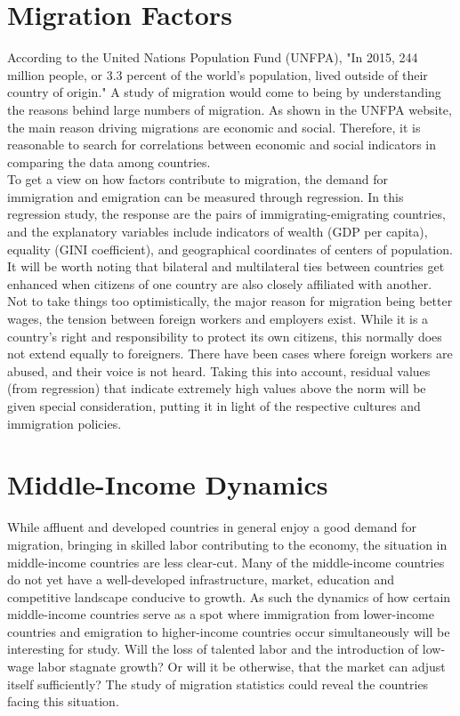 \documentclass{acm_proc_article-sp}
\begin{document}
\section{Migration Factors}
According to the United Nations Population Fund (UNFPA), "In 2015, 244 million people, or 3.3 percent of the world's population, lived outside of their country of origin." \cite{UNPopFund} A study of migration would come to being by understanding the reasons behind large numbers of migration. As shown in the UNFPA website, the main reason driving migrations are economic and social. Therefore, it is reasonable to search for correlations between economic and social indicators in comparing the data among countries.\\
To get a view on how factors contribute to migration, the demand for immigration and emigration can be measured through regression. In this regression study, the response are the pairs of immigrating-emigrating countries, and the explanatory variables include indicators of wealth (GDP per capita), equality (GINI coefficient), and geographical coordinates of centers of population. It will be worth noting that bilateral and multilateral ties between countries get enhanced when citizens of one country are also closely affiliated with another. Not to take things too optimistically, the major reason for migration being better wages, the tension between foreign workers and employers exist. While it is a country's right and responsibility to protect its own citizens, this normally does not extend equally to foreigners. There have been cases where foreign workers are abused, and their voice is not heard. Taking this into account, residual values (from regression) that indicate extremely high values above the norm will be given special consideration, putting it in light of the respective cultures and immigration policies. 

\section{Middle-Income Dynamics}
While affluent and developed countries in general enjoy a good demand for migration, bringing in skilled labor contributing to the economy, the situation in middle-income countries are less clear-cut. Many of the middle-income countries do not yet have a well-developed infrastructure, market, education and competitive landscape conducive to growth. As such the dynamics of how certain middle-income countries serve as a spot where immigration from lower-income countries and emigration to higher-income countries occur simultaneously will be interesting for study.\cite{UN2015,DRC007} Will the loss of talented labor and the introduction of low-wage labor stagnate growth? Or will it be otherwise, that the market can adjust itself sufficiently? The study of migration statistics could reveal the countries facing this situation.
\end{document}
